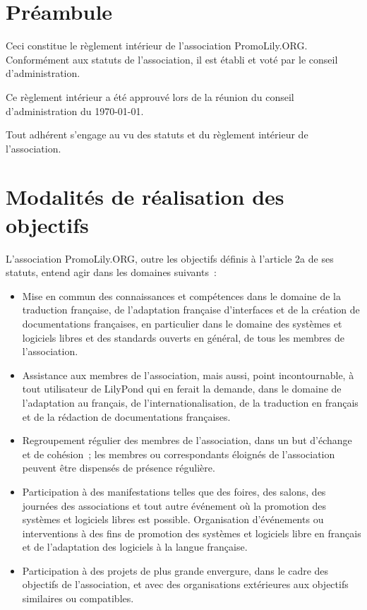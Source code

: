 \documentclass[a4wide,12pt]{scrartcl}
\newcommand{\qui}{PromoLily.ORG\xspace}
\newcommand{\quand}{\today}
\begin{document}
\section*{Préambule}
Ceci constitue le règlement intérieur de l'association \qui.\\
Conformément aux statuts de l'association, il est établi et voté par le
conseil d'administration.

Ce règlement intérieur a été approuvé lors de la réunion du conseil
d'administration du \quand. 

Tout adhérent s'engage au vu des statuts et du règlement intérieur de
l'association.


\section{Modalités de réalisation des objectifs}

L'association \qui, outre les objectifs définis à l'article 2a
de ses statuts, entend agir dans les domaines suivants~:

\begin{itemize}
\item Mise en commun des connaissances et compétences dans le domaine
  de la traduction française, de l'adaptation française d'interfaces
  et de la création de documentations françaises, en particulier dans
  le domaine des systèmes et logiciels libres et des standards ouverts
  en général, de tous les membres de l'association. 
\item Assistance aux membres de l'association, mais aussi, point
  incontournable, à tout utilisateur de LilyPond qui en ferait la
  demande, dans le domaine de l'adaptation au français, de
  l'internationalisation, de la traduction en français et de la
  rédaction de documentations françaises.
\item Regroupement régulier des membres de l'association, dans un but
  d'échange et de cohésion~; les membres ou correspondants éloignés de
  l'association peuvent être dispensés de présence régulière.
\item Participation à des manifestations telles que des foires, des
  salons, des journées des associations et tout autre événement où la
  promotion des systèmes et logiciels libres est possible.
  Organisation d'événements ou interventions à des fins de promotion
  des systèmes et logiciels libre en français et de l'adaptation des
  logiciels à la langue française.
\item Participation à des projets de plus grande envergure, dans le
  cadre des objectifs de l'association, et avec des organisations
  extérieures aux objectifs similaires ou compatibles.
\end{itemize}
\end{document}

